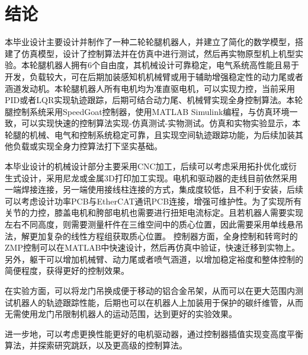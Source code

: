 \section{结论}
  本毕业设计主要设计并制作了一种二轮轮腿机器人，并建立了简化的数学模型，搭建了仿真模型，设计了控制算法并在仿真中进行测试，然后再实物原型机上机型实验。本轮腿机器人拥有6个自由度，其机械设计可靠稳定，电气系统高性能且易于开发，负载较大，可在后期加装感知机机械臂或用于辅助增强稳定性的动力尾或者涵道发动机。本轮腿机器人所有电机均为准直驱电机，可以实现力控，当前采用PID或者LQR实现轨迹跟踪，后期可结合动力尾、机械臂实现全身控制算法。本轮腿控制系统采用SpeedGoat控制器，使用MATLAB Simulink编程，与仿真环境一致，可以实现快速的控制算法实现-仿真测试-实物测试。仿真和实物实验显示，本轮腿的机械、电气和控制系统稳定可靠，且实现空间轨迹跟踪功能，为后续加装其他负载或实现全身力控算法打下坚实基础。 
  
  本毕业设计的机械设计部分主要采用CNC加工，后续可以考虑采用拓扑优化或衍生式设计，采用尼龙或金属3D打印加工实现。电机和驱动器的走线目前依然采用一端焊接连接，另一端使用接线柱连接的方式，集成度较低，且不利于安装，后续可以考虑设计功率PCB与EtherCAT通讯PCB连接，增强可维护性。为了实现所有关节的力控，膝盖电机和胯部电机也需要进行扭矩电流标定。且若机器人需要实现左右不同高度，则需要测量杆件在三维空间中的质心位置，因此需要采用单线悬吊法，解更加复杂的线性方程组获取质心位置。
  控制器方面，全身控制和转弯时的ZMP控制可以在MATLAB中快速设计，然后再仿真中验证，快速迁移到实物上。另外，躯干可以增加机械臂、动力尾或者喷气涵道，以增加稳定裕度和整体控制的简便程度，获得更好的控制效果。
  
  在实验方面，可以将龙门吊换成便于移动的铝合金吊架，从而可以在更大范围内测试机器人的轨迹跟踪性能，后期也可以在机器人上加装用于保护的碳纤维管，从而无需使用龙门吊限制机器人的运动范围，达到更好的实验效果。
  
  进一步地，可以考虑更换性能更好的电机驱动器，通过控制器插值实现变高度平衡算法，并探索研究跳跃，以及更高级的控制算法。
